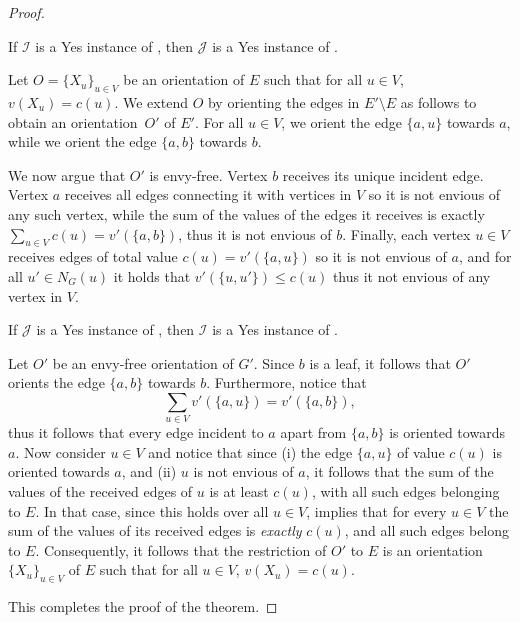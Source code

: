 \documentclass[11pt,letterpaper]{article}
\begin{document}
\begin{proof}
    \begin{claim}
        If $\mathcal{I}$ is a Yes instance of {\TOO},
        then $\mathcal{J}$ is a Yes instance of \EFo.
    \end{claim}

    \begin{nestedproof}
        Let $O=\{X_u\}_{u \in V}$ be an orientation of $E$ such that for all $u \in V$, $v(X_u) = c(u)$.
        We extend $O$ by orienting the edges in $E' \setminus E$ as follows to obtain an orientation~$O'$ of $E'$.
        For all $u \in V$, we orient the edge $\{a,u\}$ towards $a$, while we orient the edge $\{a,b\}$ towards $b$.

        We now argue that $O'$ is envy-free.
        Vertex $b$ receives its unique incident edge.
        Vertex $a$ receives all edges connecting it with vertices in $V$ so it is not envious of any such vertex,
        while the sum of the values of the edges it receives is exactly $\sum_{u \in V} c(u) = v'(\{a,b\})$, thus it is not envious of $b$.
        Finally, each vertex $u \in V$ receives edges of total value $c(u) = v'(\{a,u\})$ so it is not envious of $a$,
        and for all $u' \in N_G (u)$ it holds that $v'(\{u,u'\}) \le c(u)$ thus it not envious of any vertex in $V$.
    \end{nestedproof}

    \begin{claim}
        If $\mathcal{J}$ is a Yes instance of \EFo,
        then $\mathcal{I}$ is a Yes instance of {\TOO}.
    \end{claim}

    \begin{nestedproof}
        Let $O'$ be an envy-free orientation of $G'$.
        Since $b$ is a leaf, it follows that $O'$ orients the edge $\{a,b\}$ towards $b$.
        Furthermore, notice that
        \[
            \sum_{u \in V} v'(\{a,u\}) = v'(\{a,b\}),
        \]
        thus it follows that every edge incident to $a$ apart from $\{a,b\}$ is oriented towards $a$.
        Now consider $u \in V$ and notice that since
        (i) the edge $\{a,u\}$ of value $c(u)$ is oriented towards $a$,
        and (ii) $u$ is not envious of $a$,
        it follows that the sum of the values of the received edges of $u$ is at least $c(u)$,
        with all such edges belonging to $E$.
        In that case, since this holds over all $u \in V$,
         implies that for every $u \in V$ the sum of the values of its received edges is \emph{exactly} $c(u)$,
        and all such edges belong to $E$.
        Consequently, it follows that the restriction of $O'$ to $E$ is an orientation $\{X_u\}_{u \in V}$ of $E$ such that for all $u \in V$, $v(X_u) = c(u)$.
    \end{nestedproof}
    This completes the proof of the theorem.
\end{proof}
\end{document}
